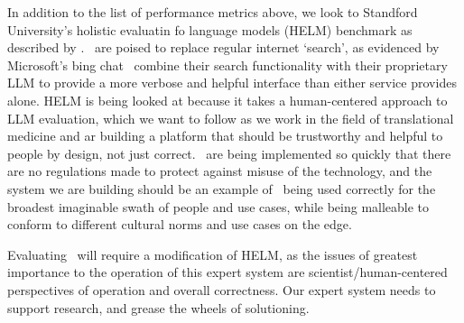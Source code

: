 In addition to the list of performance metrics above, we look to Standford University's holistic evaluatin fo language models (HELM) benchmark as described by \cite{Liang:2022:helm}.
\llms\ are poised to replace regular internet `search', as evidenced by Microsoft's bing chat~\cite{BingChat:2023} combine their search functionality with their proprietary LLM to provide a more verbose and helpful interface than either service provides alone.
HELM is being looked at because it takes a human-centered approach to LLM evaluation, which we want to follow as we work in the field of translational medicine and ar building a platform that should be trustworthy and helpful to people by design, not just correct.
\llms\ are being implemented so quickly that there are no regulations made to protect against misuse of the technology, and the system we are building should be an example of \llms\ being used correctly for the broadest imaginable swath of people and use cases, while being malleable to conform to different cultural norms and use cases on the edge.

Evaluating \project\ will require a modification of HELM, as the issues of greatest importance to the operation of this expert system are scientist/human-centered perspectives of operation and overall correctness.
Our expert system needs to support research, and grease the wheels of solutioning.


